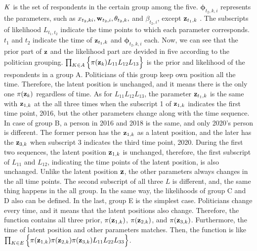 \documentclass[a4paper, 11pt]{report}
\begin{document}
\begin{itemize}
\quad $\it{K}$ is the set of respondents in the certain group among the five. $\boldsymbol{\phi}_{t_2,k,i}$ represents the parameters, such as $x_{t_2,ki}, {\bf w}_{t_2,i}, \theta_{t_2,k},$ and $\beta_{t_2,i}$, except ${\bf z}_{t_1,k}$ . The subscripts of likelihood $L_{t_1,t_2}$ indicate the time points to which each parameter corresponds. $t_1$ and $t_2$ indicate the time of ${\bf z}_{t_1,k}$ and $\boldsymbol{\phi}_{t_2,k,i}$ each. Now, we can see that the prior part of ${\bf z}$ and the likelihood part are devided in five according to the politician grouping. $\prod_{K\in A}\Big \{\pi({\bf z}_{k}) L_{11} L_{12} L_{13} \Big \}$ is the prior and likelihood of the respondents in a group A. Politicians of this group keep own position all the time. Therefore, the latent position is unchanged, and it means there is the only one $\pi({\bf z}_{k})$ regardless of time. As for $L_{11} L_{12} L_{13}$, the parameter ${\bf z}_{t_1,k}$ is the same with ${\bf z}_{1,k}$ at the all three times when the subscript 1 of ${\bf z}_{1,k}$ indicates the first time point, 2016, but the other parameters change along with the time sequence. In case of group B, a person in 2016 and 2018 is the same, and only 2020's person is different. The former person has the ${\bf z}_{1,k}$ as a latent position, and the later has the ${\bf z}_{3,k}$ when subscript 3 indicates the third time point, 2020. During the first two sequences, the latent position ${\bf z}_{1,k}$ is unchanged, therefore, the first subscript of $L_{11}$ and $L_{12}$, indicating the time points of the latent position, is also unchanged. Unlike the latent position ${\bf z}$, the other parameters always changes in the all time points. The second subscript of all three $L$ is different, and, the same thing happens in the all group. In the same way, the likelihoods of group C and D also can be defined. In the last, group E is the simplest case. Politicians change every time, and it means that the latent positions also change. Therefore, the function contains all three prior, $\pi({\bf z}_{1,k})$, $\pi({\bf z}_{2,k})$, and $\pi({\bf z}_{3,k})$. Furthermore, the time of latent position and other parameters matches. Then, the function is like $\prod_{K\in E}\Big \{\pi({\bf z}_{1,k}) \pi({\bf z}_{2,k}) \pi({\bf z}_{3,k}) L_{11} L_{22} L_{33} \Big \}$.








\end{itemize}
\end{document}
